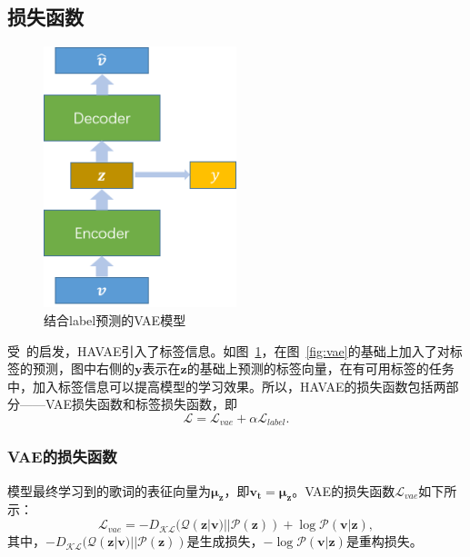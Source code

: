 \subsection{损失函数}
\begin{figure}[h]
  \centering
  \includegraphics[width=0.5\textwidth]{label_vae.png}
  \caption{结合label预测的VAE模型}
  \label{fig:label_vae}
\end{figure}
受~\autocite{Kingma2014Semi}的启发，HAVAE引入了标签信息。如图~\ref{fig:label_vae}，在图~\ref{fig:vae}的基础上加入了对标签的预测，图中右侧的$\bm y$表示在$\bm z$的基础上预测的标签向量，在有可用标签的任务中，加入标签信息可以提高模型的学习效果。所以，HAVAE的损失函数包括两部分——VAE损失函数和标签损失函数，即
\begin{equation}
\label{eq:loss}
\mathcal L= \mathcal L_{vae}+\alpha\mathcal L_{label}.
\end{equation}
\par


\subsubsection{VAE的损失函数}
模型最终学习到的歌词的表征向量为$\bm{\mu_z}$，即$\bm{v_t} = \bm{\mu_z}$。VAE的损失函数$\mathcal L_{vae}$如下所示：
\begin{equation}
    \mathcal{L}_{vae}=-D_{\mathcal{KL}}(\mathcal{Q}(\bm z|\bm v)||\mathcal{P}(\bm z))+\log\mathcal{P}(\bm v|\bm z),
\end{equation}
其中，$-D_{\mathcal{KL}}(\mathcal{Q}(\bm z|\bm v)||\mathcal{P}(\bm z))$是生成损失，$-\log\mathcal{P}(\bm v|\bm z)$是重构损失。\par

